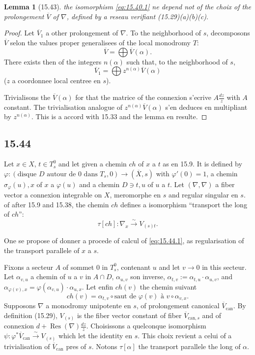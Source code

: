 \documentclass[12pt,a4paper]{article}
\theoremstyle{plain}
\newtheorem{lemma}[theorem]{Lemma}
\theoremstyle{definition}
\theoremstyle{remark}
\DeclareMathOperator{\Res}{Res}
\begin{document}
\begin{lemma}[15.43]
the isomorphism \eqref{eq:15.40.1} ne depend not of the choix of the prolongement $\overline{V}$ of $\nabla$, defined by a reseau verifiant (15.29)(a)(b)(c).
\end{lemma}

\begin{proof}
Let $\overline{V}_1$ a other prolongement of $\nabla$. To the neighborhood of $s$, decomposons $\overline{V}$ selon the values proper generalisees of the local monodromy $T$:
\[
\overline{V} = \bigoplus \overline{V}(\alpha).
\]
There exists then of the integers $n(\alpha)$ such that, to the neighborhood of $s$,
\[
\overline{V}_1 = \bigoplus z^{n(\alpha)} \overline{V}(\alpha)
\]
($z$ a coordonnee local centree en $s$).

Trivialisons the $\overline{V}(\alpha)$ for that the matrice of the connexion s'ecrive $A \frac{dz}{z}$ with $A$ constant. The trivialisation analogue of $z^{n(\alpha)} \overline{V}(\alpha)$ s'en deduces en multipliant by $z^{n(\alpha)}$. This is a accord with 15.33 and the lemma en resulte.
\end{proof}

\subsection*{15.44}

Let $x \in X$, $t \in T_s^0$ and let given a chemin $ch$ of $x$ a $t$ as en 15.9. It is defined by $\varphi: (\text{disque } D \text{ autour de } 0 \text{ dans } T_s, 0) \to (\overline{X}, s)$ with $\varphi'(0) = 1$, a chemin $\sigma_\varphi(u), x$ of $x$ a $\varphi(u)$ and a chemin $D \ni t, u$ of $u$ a $t$. Let $(\nabla, \nabla)$ a fiber vector a connexion integrable on $X$, meromorphe en $s$ and regular singular en $s$. of after 15.9 and 15.38, the chemin $ch$ defines a isomorphism ``transport the long of $ch$'':
\begin{equation}\label{eq:15.44.1}
\tau[ch]: \nabla_x \xrightarrow{\sim} V_{(s)t}.
\end{equation}

One se propose of donner a procede of calcul of \eqref{eq:15.44.1}, as regularisation of the transport parallele of $x$ a $s$.

Fixons a secteur $A$ of sommet $0$ in $T_s^0$, contenant $u$ and let $v \to 0$ in this secteur. Let $\alpha_{v,u}$ a chemin of $u$ a $v$ in $A \cap D$, $\alpha_{u,v}$ son inverse, $\alpha_{t,v} := \alpha_{t,u} \cdot \alpha_{u,v}$, and $\alpha_{\varphi(v), x} = \varphi(\alpha_{v,u}) \cdot \alpha_{u,x}$. Let enfin $ch(v)$ the chemin suivant
\[
ch(v) = \alpha_{t,v} \circ \text{saut de } \varphi(v) \text{ à } v \circ \alpha_{v,x}.
\]
Supposons $\nabla$ a monodromy unipotente en $s$, of prolongement canonical $\overline{V}_{\text{can}}$. By definition (15.29), $V_{(s)}$ is the fiber vector constant of fiber $\overline{V}_{\text{can}, s}$ and of connexion $d + \Res(\nabla) \frac{dz}{z}$. Choisissons a quelconque isomorphism $\psi: \varphi^* \overline{V}_{\text{can}} \xrightarrow{\sim} V_{(s)}$ which let the identity en $s$. This choix revient a celui of a trivialisation of $\overline{V}_{\text{can}}$ pres of $s$. Notons $\tau[\alpha]$ the transport parallele the long of $\alpha$.
\end{document}
